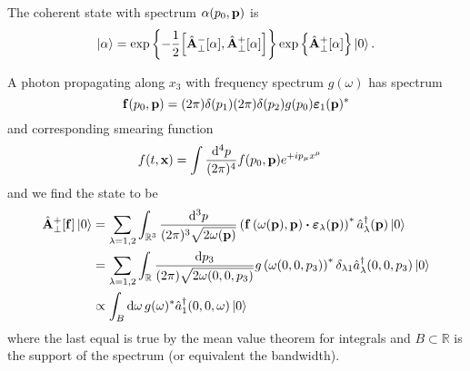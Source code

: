 \begin{definition}
	The coherent state with spectrum $\vb{\alpha}(p_0,\vb{p})$ is
	\begin{equation}
		\label{eq:qmw_coherent_state}
		\ket{\vb{\alpha}}
		=
		\exp\left\{
			-
			\frac{1}{2}
			\comm{\hat{\vb{A}}_\perp^-[\vb{\alpha}]}{\hat{\vb{A}}_\perp^+[\vb{\alpha}]}
		\right\}
		\exp\left\{
			\hat{\vb{A}}_\perp^+[\vb{\alpha}]
		\right\}
		\ket{0}
		.
	\end{equation}
\end{definition}
\begin{example}
	A photon propagating along $x_3$ with frequency spectrum $g(\omega)$ has spectrum
	\begin{equation}
		\vb{f}(p_0,\vb{p})
		=
		(2\pi)\delta(p_1)
		(2\pi)\delta(p_2)
		g(p_0)
		\boldsymbol{\varepsilon}_1(\vb{p})^*
	\end{equation}
	and corresponding smearing function
	\begin{equation}
		\begin{split}
			f(t,\vb{x})
			&=
			\int\frac{\dd[4]{p}}{(2\pi)^4}
			f(p_0,\vb{p})e^{+ip_\mu x^\mu}
		\end{split}
	\end{equation}
	and we find the state to be
	\begin{equation}
		\begin{split}
			\hat{\vb{A}}_\perp^+[\vb{f}]
			\ket{0}
			&=
			\sum_{\lambda=1,2}
			\int_{\mathbb{R}^3}\frac{\dd[3]{p}}{(2\pi)^3\sqrt{2\omega(\vb{p})}}
			\left(
				\vb{f}\left(\omega(\vb{p}),\vb{p}\right)
				\vdot
				\boldsymbol{\varepsilon}_\lambda(\vb{p})
			\right)^*
			\hat{a}_\lambda^\dagger(\vb{p})
			\ket{0}
			\\
			&=
			\sum_{\lambda=1,2}
			\int_{\mathbb{R}}\frac{\dd{p_3}}{(2\pi)\sqrt{2\omega(0,0,p_3)}}
			g\left(\omega(0,0,p_3)\right)^*
			\delta_{\lambda1}
			\hat{a}_\lambda^\dagger(0,0,p_3)
			\ket{0}
			\\
			&\propto
			\int_B\dd{\omega}
			g(\omega)^*
			\hat{a}_1^\dagger(0,0,\omega)
			\ket{0}
		\end{split}
	\end{equation}
	where the last equal is true by the mean value theorem for integrals and $B\subset\mathbb{R}$ is the support of the spectrum (or equivalent the bandwidth).
\end{example}